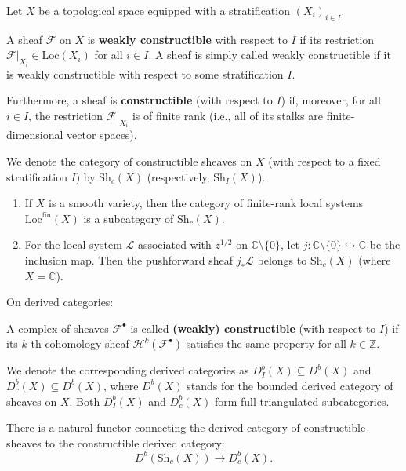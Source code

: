 \begin{definition}
Let $X$ be a topological space equipped with a stratification $(X_i)_{i \in I}$. 

A sheaf $\mathcal{F}$ on $X$ is \textbf{weakly constructible} with respect to $I$ if its restriction $\mathcal{F}|_{X_i} \in \mathrm{Loc}(X_i)$ for all $i \in I$. A sheaf is simply called weakly constructible if it is weakly constructible with respect to some stratification $I$.

Furthermore, a sheaf is \textbf{constructible} (with respect to $I$) if, moreover, for all $i \in I$, the restriction $\mathcal{F}|_{X_i}$ is of finite rank (i.e., all of its stalks are finite-dimensional vector spaces).
\end{definition}

We denote the category of constructible sheaves on $X$ (with respect to a fixed stratification $I$) by $\mathrm{Sh}_c(X)$ (respectively, $\mathrm{Sh}_I(X)$).

\begin{example}
    \begin{enumerate}
    \item If $X$ is a smooth variety, then the category of finite-rank local systems $\mathrm{Loc}^{\mathrm{fin}}(X)$ is a subcategory of $\mathrm{Sh}_c(X)$.
    \item For the local system $\mathcal{L}$ associated with $z^{1/2}$ on $\mathbb{C} \setminus \{0\}$, let $j: \mathbb{C} \setminus \{0\} \hookrightarrow \mathbb{C}$ be the inclusion map. Then the pushforward sheaf $j_*\mathcal{L}$ belongs to $\mathrm{Sh}_c(X)$ (where $X = \mathbb{C}$).
\end{enumerate}
\end{example}


On derived categories:
\begin{definition}
A complex of sheaves $\mathcal{F}^\bullet$ is called \textbf{(weakly) constructible} (with respect to $I$) if its $k$-th cohomology sheaf $\mathcal{H}^k(\mathcal{F}^\bullet)$ satisfies the same property for all $k \in \mathbb{Z}$.
\end{definition}

We denote the corresponding derived categories as $D_I^b(X) \subseteq D^b(X)$ and $D_c^b(X) \subseteq D^b(X)$, where $D^b(X)$ stands for the bounded derived category of sheaves on $X$. Both $D_I^b(X)$ and $D_c^b(X)$ form full triangulated subcategories.

There is a natural functor connecting the derived category of constructible sheaves to the constructible derived category:
\[ D^b(\mathrm{Sh}_c(X)) \longrightarrow D_c^b(X). \]

